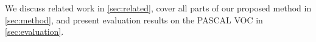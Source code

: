 
We discuss related work in \autoref{sec:related}, cover all parts of our proposed method in \autoref{sec:method}, and present evaluation results on the PASCAL VOC in \autoref{sec:evaluation}.
